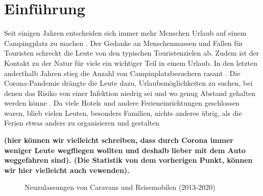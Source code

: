 \section{Einführung}


Seit einigen Jahren entscheiden sich immer mehr Menschen Urlaub auf einem Campingplatz zu machen \cite{periodical:ANST}.
Der Gedanke an Menschenmassen und Fallen für Touristen schreckt die Leute von den typischen Touristenzielen ab. 
Zudem ist der Kontakt zu der Natur für viele ein wichtiger Teil in einem Urlaub. In den letzten anderthalb 
Jahren stieg die Anzahl von Campinplatzbesuchern rasant \cite{periodical:UBST}. Die Corona-Pandemie drängte die Leute dazu, 
Urlaubsmöglichkeiten zu suchen, bei denen das Risiko von einer Infektion niedrig sei und wo genug Abstand gehalten 
werden könne \cite{periodical:AUST}. Da viele Hotels und andere Ferieneinrichtungen geschlossen waren, blieb 
vielen Leuten, besonders Familien, nichts anderes übrig, als die Ferien etwas anders zu organisieren und gestalten 

\textbf{(hier können wir vielleicht schreiben, dass durch Corona immer weniger Leute wegfliegen wollten und deshalb lieber
mit dem Auto weggefahren sind). (Die Statistik von dem vorherigen Punkt, können wir hier vielleicht auch vewenden).}

\vfill
\begin{figure}[H]
    \caption{Neuzulassungen von Caravans und Reisemobilen (2013-2020) \cite{periodical:UBST}}
    \label{fig:periodical_ANST}
\end{figure}

